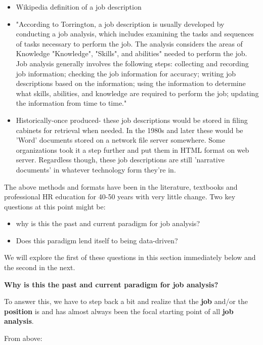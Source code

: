 \documentclass[12pt,letterpaper]{article}
\begin{document}
\begin{itemize}
\item
Wikipedia definition of a job description 

\item "According to Torrington, a job description is usually developed by conducting a job analysis, which includes examining the tasks and sequences of tasks
    necessary to perform the job. The analysis considers the areas of
    Knowledge "Knowledge",
    "Skills", and 
    abilities"
    needed to perform the job. Job analysis generally involves the following
    steps: collecting and recording job information; checking the
    job information for accuracy; writing job descriptions based 
    on the information; using the information to determine what skills,
    abilities, and knowledge are required to perform the job; updating the information from time to time."

\item Historically-once produced- these job descriptions would be stored 
in filing cabinets for retrieval when needed.
    In the 1980s and later these would be 'Word' documents stored on a
    network file server somewhere.
    Some organizations took it a step further and put them in HTML format
    on web server.
    Regardless though, these job descriptions are still 'narrative documents'
    in whatever technology form they're in.
\end{itemize}

The above methods and formats have been in the literature, textbooks and
professional HR education for 40-50 years with very little change. Two
key questions at this point might be:

\begin{itemize}
\item
  why is this the past and current paradigm for job analysis?
\item
  Does this paradigm lend itself to being data-driven?
\end{itemize}

We will explore the first of these questions in this section immediately
below and the second in the next.

\textbf{Why is this the past and current paradigm for job analysis?}

To answer this, we have to step back a bit and realize that the
\textbf{job} and/or the \textbf{position} is and has almost always been
the focal starting point of all \textbf{job analysis}.

From above:
\end{document}
